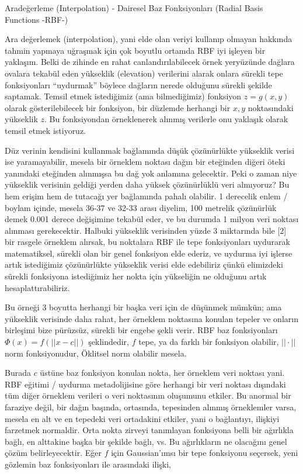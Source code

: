 \documentclass[12pt,fleqn]{article}\usepackage{../../common}
\begin{document}
Aradeğerleme (Interpolation) - Dairesel Baz Fonksiyonları (Radial Basis Functions -RBF-)

Ara değerlemek (interpolation), yani elde olan veriyi kullanıp olmayan hakkında
tahmin yapmaya uğraşmak için çok boyutlu ortamda RBF iyi işleyen bir
yaklaşım. Belki de zihinde en rahat canlandırılabilecek örnek yeryüzünde dağlara
ovalara tekabül eden yükseklik (elevation) verilerini alarak onlara sürekli tepe
fonksiyonları ``uydurmak'' böylece dağların nerede olduğunu sürekli şekilde
saptamak. Temsil etmek istediğimiz (ama bilmediğimiz) fonksiyon $z=g(x,y)$
olarak gösterilebilecek bir fonksiyon, bir düzlemde herhangi bir $x,y$
noktasındaki yükseklik $z$. Bu fonksiyondan örneklenerek alınmış verilerle onu
yaklaşık olarak temsil etmek istiyoruz.

Düz verinin kendisini kullanmak bağlamında düşük çözünürlükte yükseklik verisi
ise yaramayabilir, mesela bir örneklem noktası dağın bir eteğinden diğeri öteki
yanındaki eteğinden alınmışsa bu dağ yok anlamına gelecektir. Peki o zaman niye
yükseklik verisinin geldiği yerden daha yüksek çözünürlüklü veri almıyoruz?  Bu
hem erişim hem de tutacağı yer bağlamında pahalı olabilir. 1 derecelik enlem /
boylam içinde, mesela 36-37 ve 32-33 arası diyelim, 100 metrelik çözünürlük
demek 0.001 derece değişimine tekabül eder, ve bu durumda 1 milyon veri noktası
alınması gerekecektir. Halbuki yükseklik verisinden yüzde 3 miktarında bile [2]
bir rasgele örneklem alırsak, bu noktalara RBF ile tepe fonksiyonları uydurarak
matematiksel, sürekli olan bir genel fonksiyon elde ederiz, ve uydurma iyi
işlerse artık istediğimiz çözünürlükte yükseklik verisi elde edebiliriz çünkü
elimizdeki sürekli fonksiyona istediğimiz her nokta için yükseliğin ne olduğunu
artık hesaplattırabiliriz.

Bu örneği 3 boyutta herhangi bir başka veri için de düşünmek mümkün; ama
yükseklik verisinde daha rahat, her örneklem noktasına konulan tepeler ve
onların birleşimi bize pürüzsüz, sürekli bir engebe şekli verir. RBF baz
fonksiyonları $\Phi(x) = f(||x-c||)$ şeklindedir, $f$ tepe, ya da farklı bir
fonksiyon olabilir, $||\cdot||$ norm fonksiyonudur, Öklitsel norm olabilir
mesela.

Burada $c$ üstüne baz fonksiyon konulan nokta, her örneklem veri noktası
yani. RBF eğitimi / uydurma metadolijisine göre herhangi bir veri noktası
dışındaki tüm diğer örneklem verileri o veri noktasının oluşumunu etkiler. Bu
anormal bir faraziye değil, bir dağın başında, ortasında, tepesinden alınmış
örneklemler varsa, mesela en alt ve en tepedeki veri ortadakini etkiler, yani o
bağlantıyı, ilişkiyi farzetmek normaldir. Orta nokta zirveyi tanımlayan
fonksiyona belli bir ağırlıkla bağlı, en alttakine başka bir şekilde bağlı,
vs. Bu ağırlıkların ne olacağını genel çözüm belirleyecektir. Eğer $f$ için
Gaussian'ımsı bir tepe fonksiyonu seçersek, yeni gözlemin baz fonksiyonları ile
arasındaki ilişki,
\end{document}
